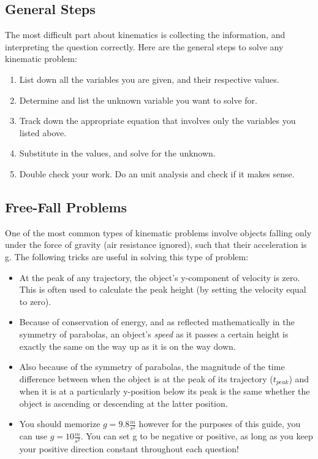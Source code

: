 \subsection{General Steps}
The most difficult part about kinematics is collecting the information, and interpreting the question correctly. Here are the general steps to solve any kinematic problem:
\begin{enumerate}
  \item List down all the variables you are given, and their respective values. 
  \item Determine and list the unknown variable you want to solve for.
  \item Track down the appropriate equation that involves only the variables you listed above.
  \item Substitute in the values, and solve for the unknown.
  \item Double check your work. Do an unit analysis and check if it makes sense.
\end{enumerate}

\subsection{Free-Fall Problems}
One of the most common types of kinematic problems involve objects falling only under the force of gravity (air resistance ignored), such that their acceleration is g. The following tricks are useful in solving this type of problem:
\begin{itemize}
    \item At the peak of any trajectory, the object's y-component of velocity is zero. This is often used to calculate the peak height (by setting the velocity equal to zero).
    \item Because of conservation of energy, and as reflected mathematically in the symmetry of parabolas, an object's \emph{speed} as it passes a certain height is exactly the same on the way up as it is on the way down.
    \item Also because of the symmetry of parabolas, the magnitude of the time difference between when the object is at the peak of its trajectory ($t_{peak}$) and when it is at a particularly y-position below its peak is the same whether the object is ascending or descending at the latter position.
    \item You should memorize $g = 9.8\frac{m}{s^2}$ however for the purposes of this guide, you can use $g = 10\frac{m}{s^2}$. You can set g to be negative or positive, as long as you keep your positive direction constant throughout each question!
\end{itemize}